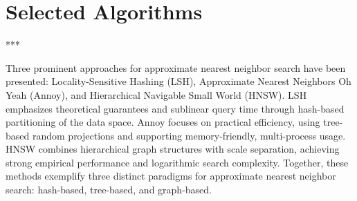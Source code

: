 \chapter{Selected Algorithms}





\begin{center}
    \vspace{0.5cm}
    *\hspace{2cm}*\hspace{2cm}*
    \vspace{0.3cm}
\end{center}

Three prominent approaches for approximate nearest neighbor search have been presented: Locality-Sensitive Hashing (LSH), Approximate Nearest Neighbors Oh Yeah (Annoy), and Hierarchical Navigable Small World (HNSW). LSH emphasizes theoretical guarantees and sublinear query time through hash-based partitioning of the data space. Annoy focuses on practical efficiency, using tree-based random projections and supporting memory-friendly, multi-process usage. HNSW combines hierarchical graph structures with scale separation, achieving strong empirical performance and logarithmic search complexity. Together, these methods exemplify three distinct paradigms for approximate nearest neighbor search: hash-based, tree-based, and graph-based.